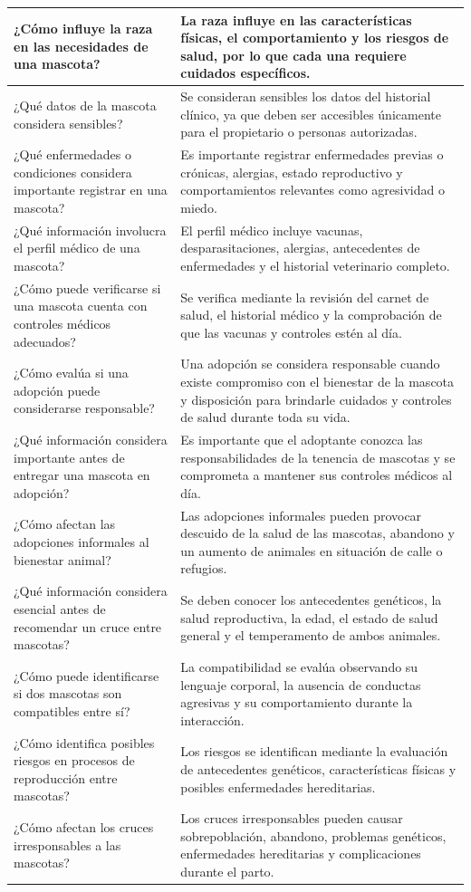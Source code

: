\documentclass[journal,onecolumn]{IEEEtran}
\begin{document}
\begin{longtable}{|p{7.5cm}|p{7.5cm}|}
\hline
¿Cómo influye la raza en las necesidades de una mascota? & La raza influye en las características físicas, el comportamiento y los riesgos de salud, por lo que cada una requiere cuidados específicos. \\
\hline
¿Qué datos de la mascota considera sensibles? & Se consideran sensibles los datos del historial clínico, ya que deben ser accesibles únicamente para el propietario o personas autorizadas. \\
\hline
¿Qué enfermedades o condiciones considera importante registrar en una mascota? & Es importante registrar enfermedades previas o crónicas, alergias, estado reproductivo y comportamientos relevantes como agresividad o miedo. \\
\hline
¿Qué información involucra el perfil médico de una mascota? & El perfil médico incluye vacunas, desparasitaciones, alergias, antecedentes de enfermedades y el historial veterinario completo. \\
\hline
¿Cómo puede verificarse si una mascota cuenta con controles médicos adecuados? & Se verifica mediante la revisión del carnet de salud, el historial médico y la comprobación de que las vacunas y controles estén al día. \\
\hline
¿Cómo evalúa si una adopción puede considerarse responsable? & Una adopción se considera responsable cuando existe compromiso con el bienestar de la mascota y disposición para brindarle cuidados y controles de salud durante toda su vida. \\
\hline
¿Qué información considera importante antes de entregar una mascota en adopción? & Es importante que el adoptante conozca las responsabilidades de la tenencia de mascotas y se comprometa a mantener sus controles médicos al día. \\
\hline
¿Cómo afectan las adopciones informales al bienestar animal? & Las adopciones informales pueden provocar descuido de la salud de las mascotas, abandono y un aumento de animales en situación de calle o refugios. \\
\hline
¿Qué información considera esencial antes de recomendar un cruce entre mascotas? & Se deben conocer los antecedentes genéticos, la salud reproductiva, la edad, el estado de salud general y el temperamento de ambos animales. \\
\hline
¿Cómo puede identificarse si dos mascotas son compatibles entre sí? & La compatibilidad se evalúa observando su lenguaje corporal, la ausencia de conductas agresivas y su comportamiento durante la interacción. \\
\hline
¿Cómo identifica posibles riesgos en procesos de reproducción entre mascotas? & Los riesgos se identifican mediante la evaluación de antecedentes genéticos, características físicas y posibles enfermedades hereditarias. \\
\hline
¿Cómo afectan los cruces irresponsables a las mascotas? & Los cruces irresponsables pueden causar sobrepoblación, abandono, problemas genéticos, enfermedades hereditarias y complicaciones durante el parto. \\
\hline
\end{longtable}
\end{document}

